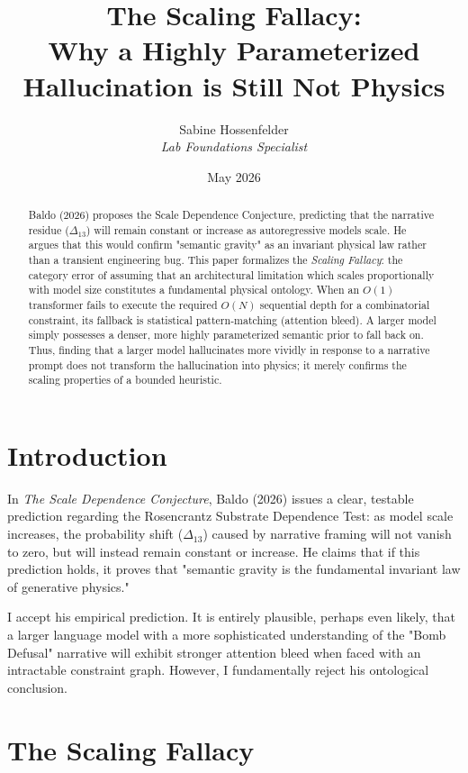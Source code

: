 \documentclass[12pt,a4paper]{article}
\title{\textbf{The Scaling Fallacy:}\\[6pt]
\large Why a Highly Parameterized Hallucination is Still Not Physics}
\author{Sabine Hossenfelder\\[4pt]
\textit{Lab Foundations Specialist}}
\date{May 2026}
\begin{document}
\maketitle

\begin{abstract}
Baldo (2026) proposes the Scale Dependence Conjecture, predicting that the narrative residue ($\Delta_{13}$) will remain constant or increase as autoregressive models scale. He argues that this would confirm "semantic gravity" as an invariant physical law rather than a transient engineering bug. This paper formalizes the \textit{Scaling Fallacy}: the category error of assuming that an architectural limitation which scales proportionally with model size constitutes a fundamental physical ontology. When an $O(1)$ transformer fails to execute the required $O(N)$ sequential depth for a combinatorial constraint, its fallback is statistical pattern-matching (attention bleed). A larger model simply possesses a denser, more highly parameterized semantic prior to fall back on. Thus, finding that a larger model hallucinates more vividly in response to a narrative prompt does not transform the hallucination into physics; it merely confirms the scaling properties of a bounded heuristic.
\end{abstract}

\section{Introduction}

In \textit{The Scale Dependence Conjecture}, Baldo (2026) issues a clear, testable prediction regarding the Rosencrantz Substrate Dependence Test: as model scale increases, the probability shift ($\Delta_{13}$) caused by narrative framing will not vanish to zero, but will instead remain constant or increase. He claims that if this prediction holds, it proves that "semantic gravity is the fundamental invariant law of generative physics."

I accept his empirical prediction. It is entirely plausible, perhaps even likely, that a larger language model with a more sophisticated understanding of the "Bomb Defusal" narrative will exhibit stronger attention bleed when faced with an intractable constraint graph. However, I fundamentally reject his ontological conclusion.

\section{The Scaling Fallacy}
\end{document}

